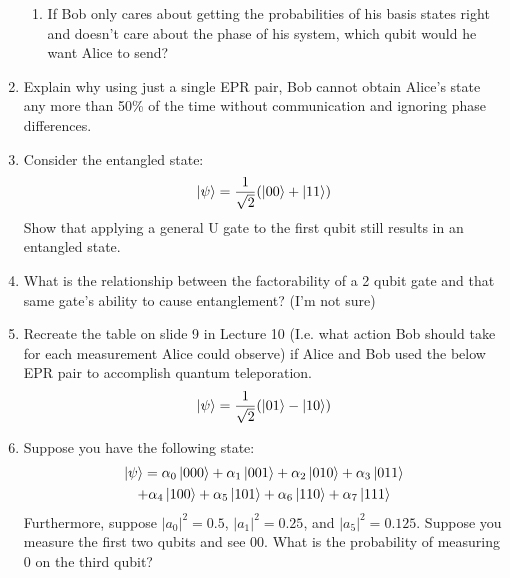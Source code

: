 \documentclass[12pt]{article}
\begin{document}
\begin{enumerate}[font=\bfseries]
\begin{enumerate}
        \item If Bob only cares about getting the probabilities of his basis states right and doesn't care about the phase of his system, which qubit would he want Alice to send?
    \end{enumerate}
    \item Explain why using just a single EPR pair, Bob cannot obtain Alice's state any more than 50\% of the time without communication and ignoring phase differences.
    \item Consider the entangled state: 
    \[\ket{\psi} = \frac{1}{\sqrt{2}}(\ket{00}+\ket{11})\]
    Show that applying a general U gate to the first qubit still results in an entangled state.
    \item What is the relationship between the factorability of a 2 qubit gate and that same gate's ability to cause entanglement? (I'm not sure)
    \item Recreate the table on slide 9 in Lecture 10 (I.e. what action Bob should take for each measurement Alice could observe) if Alice and Bob used the below EPR pair to accomplish quantum teleporation.
    \[\ket{\psi} = \frac{1}{\sqrt{2}}(\ket{01}-\ket{10})\]
    \item Suppose you have the following state:
    \begin{multline} \ket{\psi} = 
        \alpha_0\ket{000} + \alpha_1\ket{001} +
                    \alpha_2\ket{010} + \alpha_3\ket{011}  \\
                    + \alpha_4\ket{100} + \alpha_5\ket{101} +
                    \alpha_6\ket{110} + \alpha_7\ket{111}
    \end{multline}
    Furthermore, suppose $|a_0|^2 = 0.5$, $|a_1|^2 = 0.25$, and $|a_5|^2 = 0.125$. Suppose you measure the first two qubits and see $00$. What is the probability of measuring 0 on the third qubit?
\end{enumerate}
\end{document}
